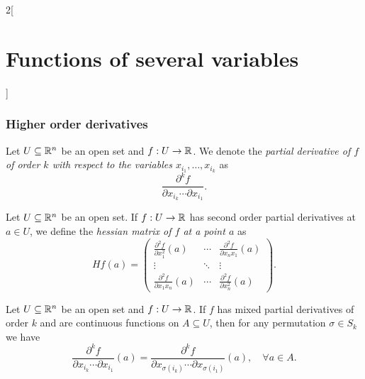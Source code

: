 \documentclass[../../../main.tex]{subfiles}
\begin{document}
\begin{multicols}{2}[\section{Functions of several variables}]
\subsubsection*{Higher order derivatives}
\begin{definition}
Let $U\subseteq\mathbb{R}^n$ be an open set and $f:U\rightarrow\mathbb{R} $. We denote the \textit{partial derivative of $f$ of order $k$ with respect to the variables $x_{i_1},\ldots,x_{i_k}$} as $$\frac{\partial^kf}{\partial x_{i_k}\cdots\partial x_{i_1}}.$$
\end{definition}
\begin{definition}
Let $U\subseteq\mathbb{R}^n$ be an open set. If $f:U\rightarrow\mathbb{R} $ has second order partial derivatives at $a\in U$, we define the \textit{hessian matrix of $f$ at a point $a$} as $$Hf(a)=\begin{pmatrix}
\displaystyle \frac{\partial^2 f}{\partial x_1^2}(a) &\cdots & \displaystyle \frac{\partial^2 f}{\partial x_nx_1}(a)\\
\vdots & \ddots & \vdots \\
\displaystyle \frac{\partial^2 f}{\partial x_1x_n}(a) & \cdots & \displaystyle \frac{\partial^2 f}{\partial x_n^2}(a)
\end{pmatrix}.$$
\end{definition}
\begin{theorem}
Let $U\subseteq\mathbb{R}^n$ be an open set and $f:U\rightarrow\mathbb{R} $. If $f$ has mixed partial derivatives of order $k$ and are continuous functions on $A\subseteq U$, then for any permutation $\sigma\in S_k$ we have $$\frac{\partial^kf}{\partial x_{i_k}\cdots\partial x_{i_1}}(a)=\frac{\partial^kf}{\partial x_{\sigma(i_k)}\cdots\partial x_{\sigma(i_1)}}(a),\quad\forall a\in A.$$
\end{theorem}

\end{multicols}
\end{document}
